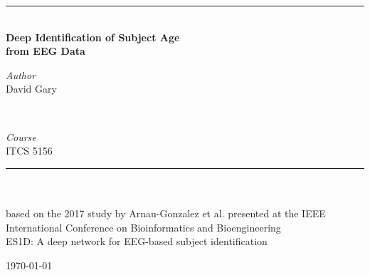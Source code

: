 \documentclass[letterpaper,twocolumn,11pt]{article}
\begin{document}
\begin{titlepage}
	\newcommand{\HRule}{\rule{\linewidth}{0.5mm}}
	
	\center

	\HRule\\[0.4cm]
	
	{\huge\bfseries Deep Identification of Subject Age\\ from EEG Data}\\[0.4cm]

	\begin{minipage}{0.4\textwidth}
		\begin{flushleft}
			\large
			\textit{Author}\\
			David Gary
		\end{flushleft}
	\end{minipage}
	~
	\begin{minipage}{0.4\textwidth}
		\begin{flushright}
			\large
			\textit{Course}\\
			ITCS 5156
		\end{flushright}
	\end{minipage}
	
	\HRule\\[1.5cm]
	
  \textit\\ based on the 2017 study by Arnau-Gonzalez et al. presented at the IEEE International Conference on Bioinformatics and Bioengineering\\[0.5cm]
	\Large ES1D: A deep network for EEG-based subject identification\cite{ES1D}\\[0.5cm]

	\vfill\vfill\vfill
	
	{\large\today} 
	
	\vfill
	
\end{titlepage}



{
  \small
  
  
}
\end{document}
